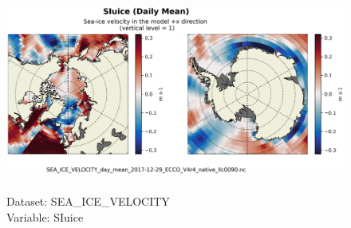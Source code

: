 \begin{figure}[H]
\centering
\includegraphics[scale=0.5]{../images/plots/native_plots/Sea-Ice_Velocity/SIuice.png}
\caption{\\Dataset: SEA\_ICE\_VELOCITY\\Variable: SIuice}
\label{tab:table-SEA_ICE_VELOCITY_SIuice-Plot}
\end{figure}
\pagebreak
